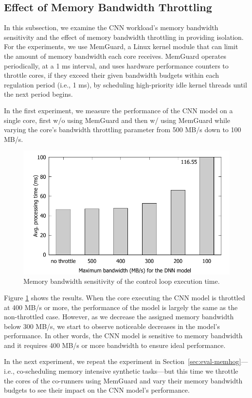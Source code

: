 \subsection{Effect of Memory Bandwidth Throttling}

In this subsection, we examine the CNN workload's memory bandwidth
sensitivity and the effect of memory bandwidth throttling in providing
isolation. For the experiments, we use MemGuard\cite{Yun2013}, a Linux
kernel module that can limit the amount of memory bandwidth each core
receives. MemGuard
operates periodically, at a 1 ms interval, and uses hardware
performance counters to throttle cores, if they exceed their given
bandwidth budgets within each regulation period (i.e., 1 ms), by
scheduling high-priority idle kernel threads until the next period begins.


In the first experiment, we measure the performance of the CNN model
on a single core, first w/o using MemGuard and then w/
using MemGuard while varying the core's bandwidth throttling parameter
from 500 MB/s down to 100 MB/s.

\begin{figure}[h]
  \centering
  \includegraphics[width=.45\textwidth]{figs/memguard_multicore}
  \caption{ Memory bandwidth sensitivity of the control loop 
execution time. }
  \label{fig:memguard_multicore}
\end{figure}

Figure \ref{fig:memguard_multicore} shows the results. When the core
executing the CNN model is throttled at 400 MB/s or more, the performance
of the model is largely the same as the non-throttled case. However, as
we decrease the assigned memory bandwidth below 300 MB/s, we start to
observe noticeable decreases in the model's performance. In other
words, the CNN model is sensitive to memory bandwidth and it
requires 400 MB/s or more bandwidth to ensure ideal performance.

In the next experiment, we repeat the experiment in
Section~\ref{sec:eval-memhog}---i.e., co-scheduling memory intensive
synthetic tasks---but this time we
throttle the cores of the co-runners using MemGuard and vary their
memory bandwidth budgets to see their impact on the CNN model's 
performance.

